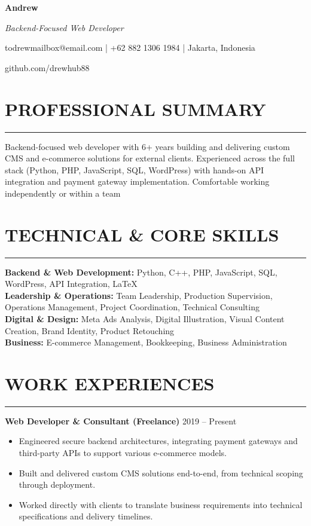 \documentclass[10pt,a4paper]{article}
\begin{document}
\centerline{\Huge \textbf{Andrew}}
\centerline{\Large \textit{Backend-Focused Web Developer}}
\vspace{0.2cm}
\centerline{todrewmailbox@email.com | +62 882 1306 1984 | Jakarta, Indonesia}
\centerline{github.com/drewhub88}

\vspace{0.5cm}
  
\section*{PROFESSIONAL SUMMARY}
\hrule
\vspace{0.2cm}
Backend-focused web developer with 6+ years building and delivering custom CMS and e-commerce solutions for external clients. Experienced across the full stack (Python, PHP, JavaScript, SQL, WordPress) with hands-on API integration and payment gateway implementation. Comfortable working independently or within a team
\vspace{0.4cm}

\section*{TECHNICAL \& CORE SKILLS}
\hrule
\vspace{0.2cm}
\textbf{Backend \& Web Development:} Python, C++, PHP, JavaScript, SQL, WordPress, API Integration, LaTeX \\
\textbf{Leadership \& Operations:} Team Leadership, Production Supervision, Operations Management, Project Coordination, Technical Consulting \\
\textbf{Digital \& Design:} Meta Ads Analysis, Digital Illustration, Visual Content Creation, Brand Identity, Product Retouching \\
\textbf{Business:} E-commerce Management, Bookkeeping, Business Administration

\vspace{0.4cm}

\section*{WORK EXPERIENCES}
\hrule
\vspace{0.2cm}

\noindent\textbf{Web Developer \& Consultant (Freelance)} \hfill 2019 -- Present
\begin{itemize}[noitemsep, topsep=0pt]
    \item Engineered secure backend architectures, integrating payment gateways and third-party APIs to support various e-commerce models.
    \item Built and delivered custom CMS solutions end-to-end, from technical scoping through deployment.
    \item Worked directly with clients to translate business requirements into technical specifications and delivery timelines.
\end{itemize}
\end{document}
